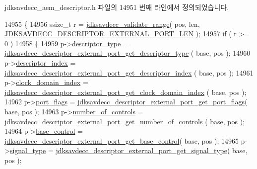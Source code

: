 jdksavdecc\+\_\+aem\+\_\+descriptor.\+h 파일의 14951 번째 라인에서 정의되었습니다.


\begin{DoxyCode}
14955 \{
14956     ssize\_t r = \hyperlink{group__util_ga9c02bdfe76c69163647c3196db7a73a1}{jdksavdecc\_validate\_range}( pos, len, 
      \hyperlink{group__descriptor__external__port_ga4512b72d9fa1db851bb69a63e50ccbe6}{JDKSAVDECC\_DESCRIPTOR\_EXTERNAL\_PORT\_LEN} );
14957     \textcolor{keywordflow}{if} ( r >= 0 )
14958     \{
14959         p->\hyperlink{structjdksavdecc__descriptor__external__port_ab7c32b6c7131c13d4ea3b7ee2f09b78d}{descriptor\_type} = 
      \hyperlink{group__descriptor__external__port_ga61c9db4cf5c834e461d29e4131697348}{jdksavdecc\_descriptor\_external\_port\_get\_descriptor\_type}
      ( base, pos );
14960         p->\hyperlink{structjdksavdecc__descriptor__external__port_a042bbc76d835b82d27c1932431ee38d4}{descriptor\_index} = 
      \hyperlink{group__descriptor__external__port_gabd5e434d744933866d1f5683a6d8bd42}{jdksavdecc\_descriptor\_external\_port\_get\_descriptor\_index}
      ( base, pos );
14961         p->\hyperlink{structjdksavdecc__descriptor__external__port_a6608f023d147b556a49527d568abed8e}{clock\_domain\_index} = 
      \hyperlink{group__descriptor__external__port_gacb1f51a04c7235612fb57dabf0f95c34}{jdksavdecc\_descriptor\_external\_port\_get\_clock\_domain\_index}
      ( base, pos );
14962         p->\hyperlink{structjdksavdecc__descriptor__external__port_a60a1f1704542df3b3f6e6db56622ddd9}{port\_flags} = 
      \hyperlink{group__descriptor__external__port_gab3078dc782693326c8de45c2906a23b2}{jdksavdecc\_descriptor\_external\_port\_get\_port\_flags}( base,
       pos );
14963         p->\hyperlink{structjdksavdecc__descriptor__external__port_a0104bea638bdadf1a547c2b93813e22f}{number\_of\_controls} = 
      \hyperlink{group__descriptor__external__port_ga154eb190781d99c3af23aabc9567dc1b}{jdksavdecc\_descriptor\_external\_port\_get\_number\_of\_controls}
      ( base, pos );
14964         p->\hyperlink{structjdksavdecc__descriptor__external__port_af06eac7dd98377a85258308e8a25e7f2}{base\_control} = 
      \hyperlink{group__descriptor__external__port_ga1272176989bcc7802c5eb3a5be6b89f4}{jdksavdecc\_descriptor\_external\_port\_get\_base\_control}( 
      base, pos );
14965         p->\hyperlink{structjdksavdecc__descriptor__external__port_a248e60ef99d5ed1779989d1dd6b6dc5a}{signal\_type} = 
      \hyperlink{group__descriptor__external__port_ga01e3b4a6a3574e0906adc870924eddca}{jdksavdecc\_descriptor\_external\_port\_get\_signal\_type}( 
      base, pos );

\end{DoxyCode}
